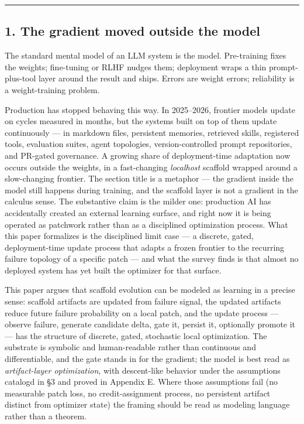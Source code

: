 \documentclass[
]{article}
\begin{document}
\begin{center}\rule{0.5\linewidth}{0.5pt}\end{center}

\subsection{1. The gradient moved outside the
model}\label{the-gradient-moved-outside-the-model}

The standard mental model of an LLM system is the model. Pre-training
fixes the weights; fine-tuning or RLHF nudges them; deployment wraps a
thin prompt-plus-tool layer around the result and ships. Errors are
weight errors; reliability is a weight-training problem.

Production has stopped behaving this way. In 2025--2026, frontier models
update on cycles measured in months, but the systems built on top of
them update continuously --- in markdown files, persistent memories,
retrieved skills, registered tools, evaluation suites, agent topologies,
version-controlled prompt repositories, and PR-gated governance. A
growing share of deployment-time adaptation now occurs outside the
weights, in a fast-changing \emph{localhost} scaffold wrapped around a
slow-changing frontier. The section title is a metaphor --- the gradient
inside the model still happens during training, and the scaffold layer
is not a gradient in the calculus sense. The substantive claim is the
milder one: production AI has accidentally created an external learning
surface, and right now it is being operated as patchwork rather than as
a disciplined optimization process. What this paper formalizes is the
disciplined limit case --- a discrete, gated, deployment-time update
process that adapts a frozen frontier to the recurring failure topology
of a specific patch --- and what the survey finds is that almost no
deployed system has yet built the optimizer for that surface.

This paper argues that scaffold evolution can be modeled as learning in
a precise sense: scaffold artifacts are updated from failure signal, the
updated artifacts reduce future failure probability on a local patch,
and the update process --- observe failure, generate candidate delta,
gate it, persist it, optionally promote it --- has the structure of
discrete, gated, stochastic local optimization. The substrate is
symbolic and human-readable rather than continuous and differentiable,
and the gate stands in for the gradient; the model is best read as
\emph{artifact-layer optimization}, with descent-like behavior under the
assumptions catalogd in §3 and proved in Appendix E. Where those
assumptions fail (no measurable patch loss, no credit-assignment
process, no persistent artifact distinct from optimizer state) the
framing should be read as modeling language rather than a theorem.
\end{document}
